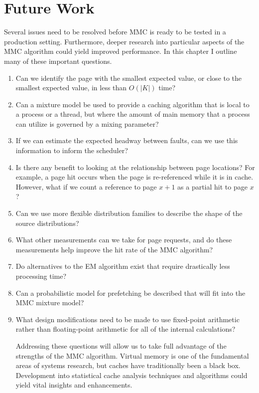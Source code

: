 \chapter{Future Work}
\label{chapter:future_work}

  Several issues need to be resolved before MMC is ready to be tested in a
  production setting. Furthermore, deeper research into particular aspects of
  the MMC algorithm could yield improved performance. In this chapter I outline
  many of these important questions.

\begin{enumerate}

\item
  Can we identify the page with the smallest expected value, or close to the
  smallest expected value, in less than $O(|K|)$ time?

\item
  Can a mixture model be used to provide a caching algorithm that is local to a
  process or a thread, but where the amount of main memory that a process can
  utilize is governed by a mixing parameter?

\item
  If we can estimate the expected headway between faults, can we use this
  information to inform the scheduler?

\item
  Is there any benefit to looking at the relationship between page locations? For
  example, a page hit occurs when the page is re-referenced while it is in
  cache. However, what if we count a reference to page $x + 1$ as a partial
  hit to page $x$?

\item
  Can we use more flexible distribution families to describe the shape of the
  source distributions?

\item
  What other measurements can we take for page requests, and do these
  measurements help improve the hit rate of the MMC algorithm?

\item
  Do alternatives to the EM algorithm exist that require drastically less
  processing time?

\item
  Can a probabilistic model for prefetching be described that will fit into the
  MMC mixture model?

\item
  What design modifications need to be made to use fixed-point arithmetic rather
  than floating-point arithmetic for all of the internal calculations?

Addressing these questions will allow us to take full advantage of the strengths
of the MMC algorithm. Virtual memory is one of the fundamental areas of
systems research, but caches have traditionally been a black box. Development
into statistical cache analysis techniques and algorithms could yield vital
insights and enhancements.

\end{enumerate}

